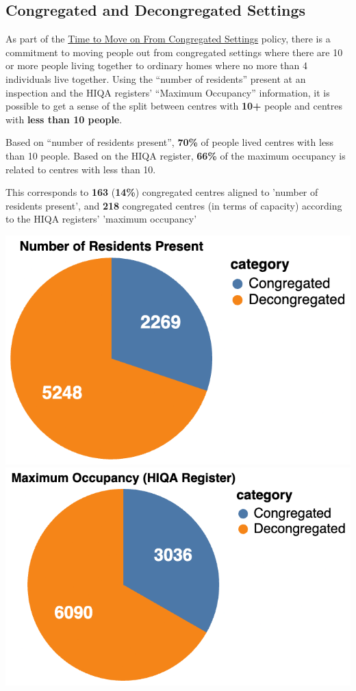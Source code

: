 \documentclass[a4paper,11pt,twoside]{article}
\begin{document}
\subsection{Congregated and Decongregated Settings}
\label{sec:org7a10c5b}

As part of the \href{https://www.hse.ie/eng/services/list/4/disability/congregatedsettings/timetomoveon.html\#:\~:text=Time\%20to\%20Move\%20on\%20from\%20Congregated\%20Settings\%20\%E2\%80\%93,people\%20to\%20\%E2\%80\%98live\%20ordinary\%20lives\%20in\%20ordinary\%20places\%E2\%80\%99.}{Time to Move on From Congregated Settings} policy, there is a commitment to moving people out from congregated settings where there are 10 or more people living together to ordinary homes where no more than 4 individuals live together. Using the ``number of residents'' present at an inspection and the HIQA registers' ``Maximum Occupancy'' information, it is possible to get a sense of the split between centres with \textbf{10+} people and centres with \textbf{less than 10 people}.

Based on ``number of residents present'', \textbf{70\%} of people lived centres with less than 10 people. Based on the HIQA register, \textbf{66\%} of the maximum occupancy is related to centres with less than 10.

This corresponds to \textbf{163} (\textbf{14\%}) congregated centres aligned to 'number of residents present', and \textbf{218} congregated centres (in terms of capacity) according to the HIQA registers' 'maximum occupancy'

\begin{center}
\includegraphics[height=0.3\textwidth]{img/05_num_residents_congregated.png}
\includegraphics[height=0.3\textwidth]{img/06_max_occ_congregated.png}
\end{center}
\end{document}
